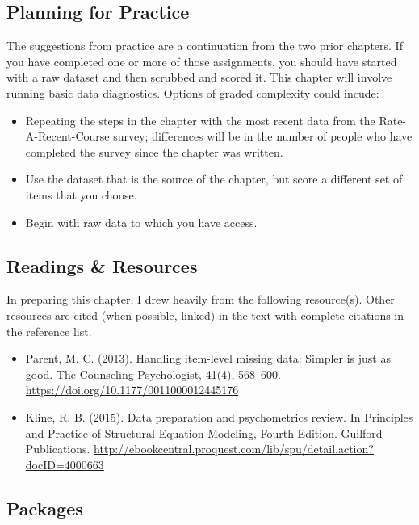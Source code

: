 \documentclass[
  english,
]{book}
\providecommand{\tightlist}{%
  \setlength{\itemsep}{0pt}\setlength{\parskip}{0pt}}
\begin{document}
\hypertarget{planning-for-practice-2}{%
\subsection{Planning for Practice}\label{planning-for-practice-2}}

The suggestions from practice are a continuation from the two prior chapters. If you have completed one or more of those assignments, you should have started with a raw dataset and then scrubbed and scored it. This chapter will involve running basic data diagnostics. Options of graded complexity could incude:

\begin{itemize}
\tightlist
\item
  Repeating the steps in the chapter with the most recent data from the Rate-A-Recent-Course survey; differences will be in the number of people who have completed the survey since the chapter was written.
\item
  Use the dataset that is the source of the chapter, but score a different set of items that you choose.
\item
  Begin with raw data to which you have access.
\end{itemize}

\hypertarget{readings-resources-2}{%
\subsection{Readings \& Resources}\label{readings-resources-2}}

In preparing this chapter, I drew heavily from the following resource(s). Other resources are cited (when possible, linked) in the text with complete citations in the reference list.

\begin{itemize}
\item
  Parent, M. C. (2013). Handling item-level missing data: Simpler is just as good. The Counseling Psychologist, 41(4), 568--600. \url{https://doi.org/10.1177/0011000012445176}
\item
  Kline, R. B. (2015). Data preparation and psychometrics review. In Principles and Practice of Structural Equation Modeling, Fourth Edition. Guilford Publications. \url{http://ebookcentral.proquest.com/lib/spu/detail.action?docID=4000663}
\end{itemize}

\hypertarget{packages-3}{%
\subsection{Packages}\label{packages-3}}
\end{document}
